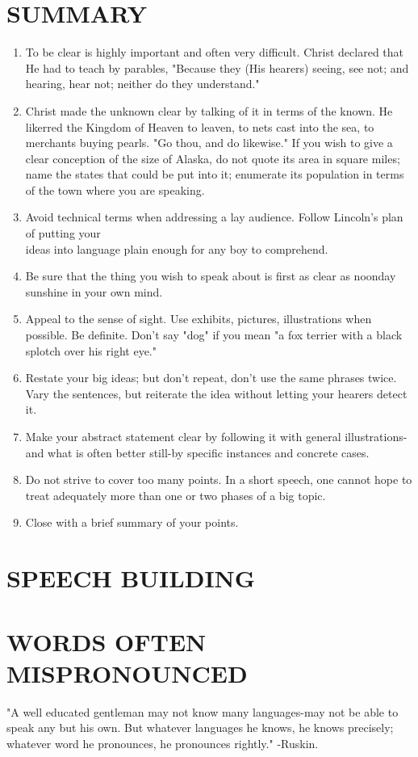\documentclass[10pt]{article}
\begin{document}
\section*{SUMMARY}
\begin{enumerate}
  \item To be clear is highly important and often very difficult. Christ declared that He had to teach by parables, "Because they (His hearers) seeing, see not; and hearing, hear not; neither do they understand."
  \item Christ made the unknown clear by talking of it in terms of the known. He likerred the Kingdom of Heaven to leaven, to nets cast into the sea, to merchants buying pearls. "Go thou, and do likewise." If you wish to give a clear conception of the size of Alaska, do not quote its area in square miles; name the states that could be put into it; enumerate its population in terms of the town where you are speaking.
  \item Avoid technical terms when addressing a lay audience. Follow Lincoln's plan of putting your\\
ideas into language plain enough for any boy to comprehend.
  \item Be sure that the thing you wish to speak about is first as clear as noonday sunshine in your own mind.
  \item Appeal to the sense of sight. Use exhibits, pictures, illustrations when possible. Be definite. Don't say "dog" if you mean "a fox terrier with a black splotch over his right eye."
  \item Restate your big ideas; but don't repeat, don't use the same phrases twice. Vary the sentences, but reiterate the idea without letting your hearers detect it.
  \item Make your abstract statement clear by following it with general illustrations-and what is often better still-by specific instances and concrete cases.
  \item Do not strive to cover too many points. In a short speech, one cannot hope to treat adequately more than one or two phases of a big topic.
  \item Close with a brief summary of your points.
\end{enumerate}

\section*{SPEECH BUILDING}
\section*{WORDS OFTEN MISPRONOUNCED}
"A well educated gentleman may not know many languages-may not be able to speak any but his own. But whatever languages he knows, he knows precisely; whatever word he pronounces, he pronounces rightly." -Ruskin.
\end{document}
